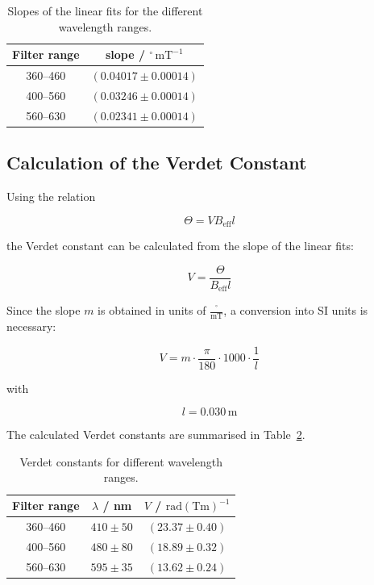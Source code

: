 \begin{table}[h!]
\centering
\begin{tabular}{cc}
\hline
Filter range & slope / $\mathrm{^\circ\,mT^{-1}}$ \\
\hline
360--460 & $(0.04017 \pm 0.00014)$ \\
400--560 & $(0.03246 \pm 0.00014)$ \\
560--630 & $(0.02341 \pm 0.00014)$ \\
\hline
\end{tabular}
\caption{Slopes of the linear fits for the different wavelength ranges.}
\label{tab:slopes}
\end{table}


\subsection{Calculation of the Verdet Constant}

Using the relation

\[
\Theta = V B_{\mathrm{eff}} l
\]

the Verdet constant can be calculated from the slope of the linear fits:

\[
V
=
\frac{\Theta}{B_{\mathrm{eff}}l}
\]

Since the slope $m$ is obtained in units of $\frac{^\circ}{\mathrm{mT}}$, a conversion into SI units is necessary:

\[
V
=
m
\cdot
\frac{\pi}{180}
\cdot
1000
\cdot
\frac{1}{l}
\]

with

\[
l = 0.030\,\mathrm{m}
\]

The calculated Verdet constants are summarised in Table~\ref{tab:verdet}.

\begin{table}[h!]
\centering
\begin{tabular}{ccc}
\hline
Filter range &
$\lambda$ / nm &
$V$ / $\mathrm{rad(Tm)^{-1}}$ \\
\hline

360--460 &
$410 \pm 50$ &
$(23.37 \pm 0.40)$ \\

400--560 &
$480 \pm 80$ &
$(18.89 \pm 0.32)$ \\

560--630 &
$595 \pm 35$ &
$(13.62 \pm 0.24)$ \\

\hline
\end{tabular}
\caption{Verdet constants for different wavelength ranges.}
\label{tab:verdet}
\end{table}

